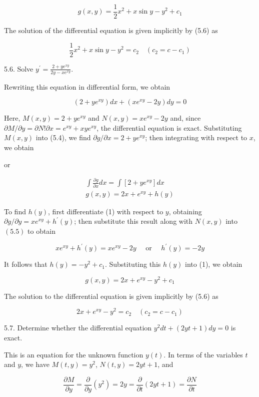 \documentclass[10pt]{article}
\begin{document}
$$
g(x, y)=\frac{1}{2} x^{2}+x \sin y-y^{2}+c_{1}
$$

The solution of the differential equation is given implicitly by (5.6) as

$$
\frac{1}{2} x^{2}+x \sin y-y^{2}=c_{2} \quad\left(c_{2}=c-c_{1}\right)
$$

5.6. Solve $y^{\prime}=\frac{2+y e^{x y}}{2 y-x e^{x y}}$.

Rewriting this equation in differential form, we obtain

$$
\left(2+y e^{x y}\right) d x+\left(x e^{x y}-2 y\right) d y=0
$$

Here, $M(x, y)=2+y e^{x y}$ and $N(x, y)=x e^{x y}-2 y$ and, since $\partial M / \partial y=\partial N ! \partial x=e^{x y}+x y e^{x y}$, the differential equation is exact. Substituting $M(x, y)$ into (5.4), we find $\partial g / \partial x=2+y e^{x y}$; then integrating with respect to $x$, we obtain

or


\begin{gather*}
\int \frac{\partial g}{\partial x} d x=\int\left[2+y e^{x y}\right] d x \\
g(x, y)=2 x+e^{x y}+h(y) \tag{1}
\end{gather*}


To find $h(y)$, first differentiate (1) with respect to $y$, obtaining $\partial g / \partial y=x e^{x y}+h^{\prime}(y)$; then substitute this result along with $N(x, y)$ into $(5.5)$ to obtain

$$
x e^{x y}+h^{\prime}(y)=x e^{x y}-2 y \quad \text { or } \quad h^{\prime}(y)=-2 y
$$

It follows that $h(y)=-y^{2}+c_{1}$. Substituting this $h(y)$ into (1), we obtain

$$
g(x, y)=2 x+e^{x y}-y^{2}+c_{1}
$$

The solution to the differential equation is given implicitly by (5.6) as

$$
2 x+e^{x y}-y^{2}=c_{2} \quad\left(c_{2}=c-c_{1}\right)
$$

5.7. Determine whether the differential equation $y^{2} d t+(2 y t+1) d y=0$ is exact.

This is an equation for the unknown function $y(t)$. In terms of the variables $t$ and $y$, we have $M(t, y)=y^{2}$, $N(t, y)=2 y t+1$, and

$$
\frac{\partial M}{\partial y}=\frac{\partial}{\partial y}\left(y^{2}\right)=2 y=\frac{\partial}{\partial t}(2 y t+1)=\frac{\partial N}{\partial t}
$$
\end{document}
